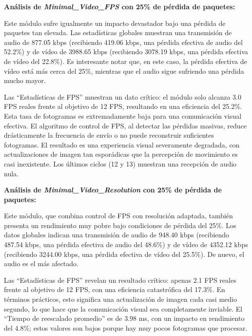 \vspace{\baselineskip}

\textbf{Análisis de \textit{Minimal\_Video\_FPS} con 25\% de pérdida de paquetes:}
\vspace{\baselineskip}

Este módulo sufre igualmente un impacto devastador bajo una pérdida de paquetes tan elevada. Las estadísticas globales muestran una transmisión de audio de 877.05 kbps (recibiendo 419.06 kbps, una pérdida efectiva de audio del 52.2\%) y de vídeo de 3988.65 kbps (recibiendo 3078.19 kbps, una pérdida efectiva de vídeo del 22.8\%). Es interesante notar que, en este caso, la pérdida efectiva de vídeo está más cerca del 25\%, mientras que el audio sigue sufriendo una pérdida mucho mayor.
\vspace{\baselineskip}

Las ``Estadísticas de FPS'' muestran un dato crítico: el módulo solo alcanza 3.0 FPS reales frente al objetivo de 12 FPS, resultando en una eficiencia del 25.2\%. Esta tasa de fotogramas es extremadamente baja para una comunicación visual efectiva. El algoritmo de control de FPS, al detectar las pérdidas masivas, reduce drásticamente la frecuencia de envío o no puede reconstruir suficientes fotogramas. El resultado es una experiencia visual severamente degradada, con actualizaciones de imagen tan esporádicas que la percepción de movimiento es casi inexistente. Los últimos ciclos (12 y 13) muestran una recepción de audio nula.

\vspace{\baselineskip}

\textbf{Análisis de \textit{Minimal\_Video\_Resolution} con 25\% de pérdida de paquetes:}
\vspace{\baselineskip}

Este módulo, que combina control de FPS con resolución adaptada, también presenta un rendimiento muy pobre bajo condiciones de pérdida del 25\%. Los datos globales indican una transmisión de audio de 948.40 kbps (recibiendo 487.54 kbps, una pérdida efectiva de audio del 48.6\%) y de vídeo de 4352.12 kbps (recibiendo 3244.00 kbps, una pérdida efectiva de vídeo del 25.5\%). De nuevo, el audio es el más afectado.
\vspace{\baselineskip}

Las ``Estadísticas de FPS'' revelan un resultado crítico: apenas 2.1 FPS reales frente al objetivo de 12 FPS, con una eficiencia catastrófica del 17.3\%. En términos prácticos, esto significa una actualización de imagen cada casi medio segundo, lo que hace que la comunicación visual sea completamente inviable. El ``Tiempo de reescalado promedio'' es de 3.98 ms, con un impacto en rendimiento del 4.8\%; estos valores son bajos porque hay muy pocos fotogramas que procesar.
\vspace{\baselineskip}


